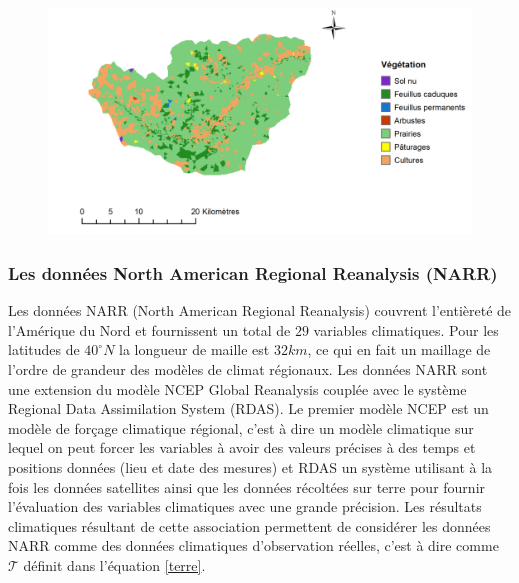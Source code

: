 \documentclass[a4paper,11pt]{article}
\numberwithin{equation}{section}
\begin{document}
\begin{figure}[H]
	\begin{center}
		\includegraphics[scale=0.3]{vegetation_little_Washita.png}
	\end{center}
	\label{fig-little-washita-vegetation}
\end{figure}

\subsubsection{Les données North American Regional Reanalysis (NARR)}
\label{ch:NARR}

Les données NARR (North American Regional Reanalysis) couvrent l'entièreté de l'Amérique du Nord et fournissent un total de $29$ variables climatiques. Pour les latitudes de $40^{\circ} N$ la longueur de maille est $32km$, ce qui en fait un maillage de l'ordre de grandeur des modèles de climat régionaux. Les données NARR sont une extension du modèle NCEP Global Reanalysis couplée avec le système Regional Data Assimilation System (RDAS). Le premier modèle NCEP est un modèle de forçage climatique régional, c'est à dire un modèle climatique sur lequel on peut forcer les variables à avoir des valeurs précises à des temps et positions données (lieu et date des mesures) et RDAS un système utilisant à la fois les données satellites ainsi que les données récoltées sur terre pour fournir l'évaluation des variables climatiques avec une grande précision. Les résultats climatiques résultant de cette association permettent de considérer les données NARR comme des données climatiques d'observation réelles, c'est à dire comme $\mathcal{T}$ définit dans l'équation \eqref{terre}. 
\end{document}
